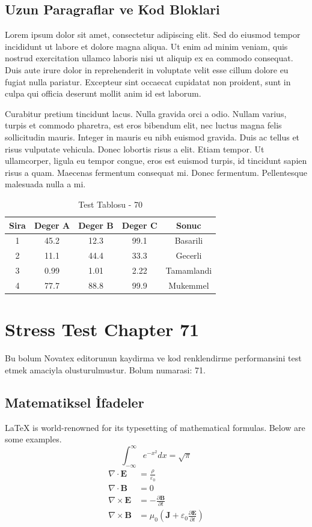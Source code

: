 \documentclass[12pt,a4paper]{article}
\begin{document}
\subsection{Uzun Paragraflar ve Kod Bloklari}
Lorem ipsum dolor sit amet, consectetur adipiscing elit. Sed do eiusmod tempor incididunt ut labore et dolore magna aliqua. Ut enim ad minim veniam, quis nostrud exercitation ullamco laboris nisi ut aliquip ex ea commodo consequat. Duis aute irure dolor in reprehenderit in voluptate velit esse cillum dolore eu fugiat nulla pariatur. Excepteur sint occaecat cupidatat non proident, sunt in culpa qui officia deserunt mollit anim id est laborum.

Curabitur pretium tincidunt lacus. Nulla gravida orci a odio. Nullam varius, turpis et commodo pharetra, est eros bibendum elit, nec luctus magna felis sollicitudin mauris. Integer in mauris eu nibh euismod gravida. Duis ac tellus et risus vulputate vehicula. Donec lobortis risus a elit. Etiam tempor. Ut ullamcorper, ligula eu tempor congue, eros est euismod turpis, id tincidunt sapien risus a quam. Maecenas fermentum consequat mi. Donec fermentum. Pellentesque malesuada nulla a mi.

\begin{table}[h!]
\centering
\begin{tabular}{|c|c|c|c|c|}
\hline
\textbf{Sira} & \textbf{Deger A} & \textbf{Deger B} & \textbf{Deger C} & \textbf{Sonuc} \\
\hline
1 & 45.2 & 12.3 & 99.1 & Basarili \\
2 & 11.1 & 44.4 & 33.3 & Gecerli \\
3 & 0.99 & 1.01 & 2.22 & Tamamlandi \\
4 & 77.7 & 88.8 & 99.9 & Mukemmel \\
\hline
\end{tabular}
\caption{Test Tablosu - 70}
\end{table}

\newpage
\section{Stress Test Chapter 71}
Bu bolum Novatex editorunun kaydirma ve kod renklendirme performansini test etmek amaciyla olusturulmustur. Bolum numarasi: 71.

\subsection{Matematiksel İfadeler}
\LaTeX{} is world-renowned for its typesetting of mathematical formulas. Below are some examples.
\begin{equation}
\int_{-\infty}^{\infty} e^{-x^2} dx = \sqrt{\pi}
\end{equation}
\begin{align}
\nabla \cdot \mathbf{E} &= \frac{\rho}{\varepsilon_0} \\
\nabla \cdot \mathbf{B} &= 0 \\
\nabla \times \mathbf{E} &= -\frac{\partial \mathbf{B}}{\partial t} \\
\nabla \times \mathbf{B} &= \mu_0\left(\mathbf{J} + \varepsilon_0 \frac{\partial \mathbf{E}}{\partial t}\right)
\end{align}
\end{document}
